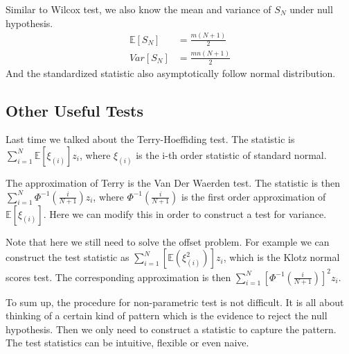 \documentclass[twoside]{article}
\begin{document}
	Similar to Wilcox test, we also know the mean and variance of $S_N$ under null hypothesis. 
	\begin{align*}
		\mathbb{E} \left[ S_N \right] &= \frac{m(N+1)}{2} \\
		Var \left[ S_N \right] &= \frac{mn (N+1)}{2}
	\end{align*}
	And the standardized statistic also asymptotically follow normal distribution. 
	
	\subsection{Other Useful Tests}
	Last time we talked about the Terry-Hoeffiding test. The statistic is $
	\sum_{i=1}^{N} \mathbb{E} \left[ \xi_{(i)} \right] z_i$, where $\xi_{(i)}$ is the i-th order statistic of standard normal. 
	
	The approximation of Terry is the Van Der Waerden test. The statistic is then $
	\sum_{i=1}^{N} \Phi^{-1} \left( \frac{i}{N+1} \right) z_i
	$, where $\Phi^{-1} \left( \frac{i}{N+1} \right)$ is the first order approximation of $\mathbb{E} \left[ \xi_{(i)} \right]$. Here we can modify this in order to construct a test for variance. 
	
	Note that here we still need to solve the offset problem. For example we can construct the test statistic as $\sum_{i=1}^{N} \left[ \mathbb{E} ( \xi_{(i)}^2 ) \right] z_i$, which is the Klotz normal scores test. The corresponding approximation is then $\sum_{i=1}^{N} \left[ \Phi^{-1} \left( \frac{i}{N+1} \right) \right]^2 z_i$. 
	
	To sum up, the procedure for non-parametric test is not difficult. It is all about thinking of a certain kind of pattern which is the evidence to reject the null hypothesis. Then we only need to construct a statistic to capture the pattern. The test statistics can be intuitive, flexible or even naive. 
	
\end{document}
